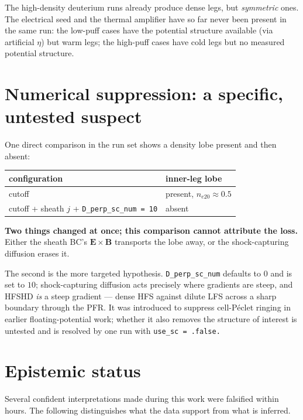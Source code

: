 \documentclass[11pt,a4paper]{article}
\newcommand{\code}[1]{\texttt{\small #1}}
\begin{document}
The high-density deuterium runs already produce dense legs, but \emph{symmetric} ones. The
electrical seed and the thermal amplifier have so far never been present in the same run: the
low-puff cases have the potential structure available (via artificial $\eta$) but warm legs;
the high-puff cases have cold legs but no measured potential structure.

\section{Numerical suppression: a specific, untested suspect}

One direct comparison in the run set shows a density lobe present and then absent:
\begin{center}
\begin{tabular}{ll}
\toprule
configuration & inner-leg lobe \\
\midrule
cutoff & present, $n_{e20}\approx0.5$ \\
cutoff + sheath $j$ + \code{D\_perp\_sc\_num = 10} & absent \\
\bottomrule
\end{tabular}
\end{center}

\begin{caution}
\textbf{Two things changed at once; this comparison cannot attribute the loss.} Either the
sheath BC's $\bm E\times\bm B$ transports the lobe away, or the shock-capturing diffusion
erases it.
\end{caution}

\noindent The second is the more targeted hypothesis. \code{D\_perp\_sc\_num} defaults to $0$
and is set to $10$; shock-capturing diffusion acts precisely where gradients are steep, and
HFSHD \emph{is} a steep gradient --- dense HFS against dilute LFS across a sharp boundary
through the PFR. It was introduced to suppress cell-P\'eclet ringing in earlier
floating-potential work; whether it also removes the structure of interest is untested and is
resolved by one run with \code{use\_sc = .false.}

\section{Epistemic status}

Several confident interpretations made during this work were falsified within hours. The
following distinguishes what the data support from what is inferred.
\end{document}
